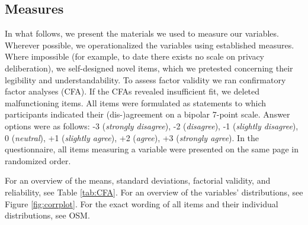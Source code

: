 \documentclass[
  english,
  man,floatsintext]{apa6}
\begin{document}
\hypertarget{measures}{%
\subsection{Measures}\label{measures}}

In what follows, we present the materials we used to measure our variables.
Wherever possible, we operationalized the variables using established measures.
Where impossible (for example, to date there exists no scale on privacy deliberation), we self-designed novel items, which we pretested concerning their legibility and understandability.
To assess factor validity we ran confirmatory factor analyses (CFA).
If the CFAs revealed insufficient fit, we deleted malfunctioning items.
All items were formulated as statements to which participants indicated their (dis-)agreement on a bipolar 7-point scale.
Answer options were as follows: -3 (\emph{strongly disagree}), -2 (\emph{disagree}), -1 (\emph{slightly disagree}), 0 (\emph{neutral}), +1 (\emph{slightly agree}), +2 (\emph{agree}), +3 (\emph{strongly agree}).
In the questionnaire, all items measuring a variable were presented on the same page in randomized order.

For an overview of the means, standard deviations, factorial validity, and reliability, see Table \ref{tab:CFA}.
For an overview of the variables' distributions, see Figure \ref{fig:corrplot}.
For the exact wording of all items and their individual distributions, see OSM.
\end{document}
